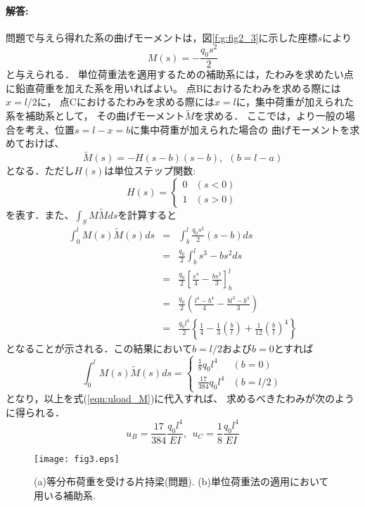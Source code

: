 \documentclass[10pt,a4j]{jarticle}
\begin{document}
\paragraph{解答:}
問題で与えら得れた系の曲げモーメントは，図\ref{f:g:fig2_3}に示した座標$s$により
\begin{equation}
	M(s)=-\frac{q_0s^2}{2}
	\label{eqn:}
\end{equation}
と与えられる．
単位荷重法を適用するための補助系には，たわみを求めたい点に鉛直荷重を加えた系を用いればよい。
点Bにおけるたわみを求める際には$x=l/2$に，	
点Cにおけるたわみを求める際には$x=l$に，集中荷重が加えられた系を補助系として，
その曲げモーメント$\tilde M$を求める．
ここでは，より一般の場合を考え、位置$s=l-x=b$に集中荷重が加えられた場合の
曲げモーメントを求めておけば、
\begin{equation}
	\tilde M(s) = -H(s-b)(s-b), \ \ (b=l-a)
	\label{eqn:}
\end{equation}
となる．ただし$H(s)$は単位ステップ関数:
\begin{equation}
	H(s)=
	\left\{
	\begin{array}{cc}
		0 &  (s<0) \\
		1 & ( s>0)
	\end{array}
	\right.
	\label{eqn:}
\end{equation}
を表す．また、$\int_SM\tilde Mds$を計算すると
\begin{eqnarray}
	\int_0^l M(s)\tilde M(s) ds
	&=&
	\int_b^l\frac{q_0s^2}{2}(s-b)ds \\
	&=&
	\frac{q_0}{2}\int_b^ls^3-bs^2ds \\
	&=&
	\frac{q_0}{2}\left[
		\frac{s^4}{4}-\frac{bs^3}{3}
		\right]_b^l \\
	&=&
	\frac{q_0}{2}
	\left(
	\frac{l^4-b^4}{4}-\frac{bl^3-b^4}{3}
	\right)
	\\
	&=&
	\frac{q_0l^4}{2}\left\{
		\frac{1}{4}
		-\frac{1}{3}
		\left(\frac{b}{l}\right)
		+
		\frac{1}{12}
		\left(\frac{b}{l}\right)^4
	\right\}
	\label{eqn:}
\end{eqnarray}
となることが示される．この結果において$b=l/2$および$b=0$とすれば
\begin{equation}
	\int_0^l M(s)\tilde M(s) ds =
	\left\{
	\begin{array}{cc}
		\frac{1}{8}q_0l^4& (b=0)  \\
		\frac{17}{384}q_0l^4& (b=l/2)  
	\end{array}
	\right.
	\label{eqn:}
\end{equation}
となり，以上を式(\ref{eqn:uload_M})に代入すれば、
求めるべきたわみが次のように得られる．
\begin{equation}
	u_B= \frac{17}{384}\frac{q_0l^4}{EI}
	, \ \ 
	u_C= \frac{1}{8}\frac{q_0l^4}{EI}
	\label{eqn:}
\end{equation}
\begin{figure}[h]
	\begin{center}
	\texttt{[image: fig3.eps]} 
	\end{center}
	\caption{(a)等分布荷重を受ける片持梁(問題).
	 (b)単位荷重法の適用において用いる補助系.} 
	\label{fig:fig2_3}
\end{figure}
\end{document}
